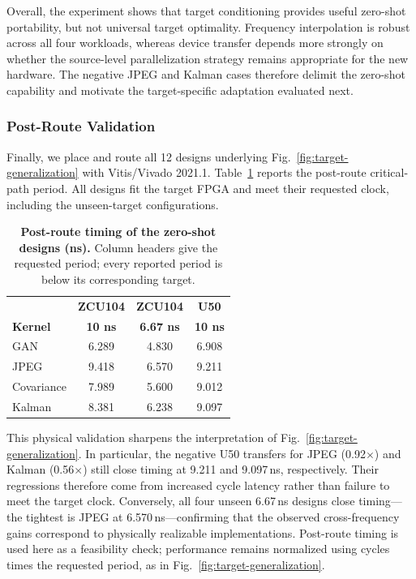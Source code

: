 Overall, the experiment shows that target conditioning provides useful
zero-shot portability, but not universal target optimality. Frequency
interpolation is robust across all four workloads, whereas device transfer
depends more strongly on whether the source-level parallelization strategy
remains appropriate for the new hardware. The negative JPEG and Kalman
cases therefore delimit the zero-shot capability and motivate the
target-specific adaptation evaluated next.



\subsubsection{Post-Route Validation}
\label{subsubsec:postroute-validation}

Finally, we place and route all 12 designs underlying
Fig.~\ref{fig:target-generalization} with Vitis/Vivado 2021.1.
Table~\ref{tab:postroute-targets} reports the post-route critical-path
period. All designs fit the target FPGA and meet their requested clock,
including the unseen-target configurations.

\begin{table}[t]
    \centering
    \caption{\textbf{Post-route timing of the zero-shot designs (ns).}
    Column headers give the requested period; every reported period is
    below its corresponding target.}
    \label{tab:postroute-targets}
    \scriptsize
    \setlength{\tabcolsep}{3.2pt}
    \renewcommand{\arraystretch}{1.03}

    \begin{tabular}{lccc}
        \toprule
        & \textbf{ZCU104} & \textbf{ZCU104} & \textbf{U50} \\
        \textbf{Kernel}
        & \textbf{10 ns}
        & \textbf{6.67 ns}
        & \textbf{10 ns} \\
        \midrule
        GAN        & 6.289 & 4.830 & 6.908 \\
        JPEG       & 9.418 & 6.570 & 9.211 \\
        Covariance & 7.989 & 5.600 & 9.012 \\
        Kalman     & 8.381 & 6.238 & 9.097 \\
        \bottomrule
    \end{tabular}
\end{table}

This physical validation sharpens the interpretation of
Fig.~\ref{fig:target-generalization}. In particular, the negative U50
transfers for JPEG (0.92$\times$) and Kalman (0.56$\times$) still close
timing at 9.211 and 9.097\,ns, respectively. Their regressions therefore
come from increased cycle latency rather than failure to meet the target
clock. Conversely, all four unseen 6.67\,ns designs close timing---the
tightest is JPEG at 6.570\,ns---confirming that the observed
cross-frequency gains correspond to physically realizable implementations.
Post-route timing is used here as a feasibility check; performance remains
normalized using cycles times the requested period, as in
Fig.~\ref{fig:target-generalization}.



